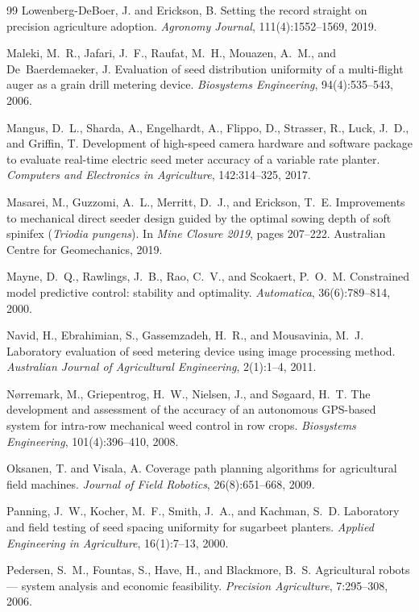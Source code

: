 \begin{thebibliography}{99}
Lowenberg-DeBoer, J. and Erickson, B.
Setting the record straight on precision agriculture adoption.
\textit{Agronomy Journal}, 111(4):1552--1569, 2019.

Maleki, M.~R., Jafari, J.~F., Raufat, M.~H., Mouazen, A.~M., and De~Baerdemaeker, J.
Evaluation of seed distribution uniformity of a multi-flight auger as a grain drill metering device.
\textit{Biosystems Engineering}, 94(4):535--543, 2006.

Mangus, D.~L., Sharda, A., Engelhardt, A., Flippo, D., Strasser, R., Luck, J.~D., and Griffin, T.
Development of high-speed camera hardware and software package to evaluate real-time electric seed meter accuracy of a variable rate planter.
\textit{Computers and Electronics in Agriculture}, 142:314--325, 2017.

Masarei, M., Guzzomi, A.~L., Merritt, D.~J., and Erickson, T.~E.
Improvements to mechanical direct seeder design guided by the optimal sowing depth of soft spinifex (\textit{Triodia pungens}).
In \textit{Mine Closure 2019}, pages 207--222. Australian Centre for Geomechanics, 2019.

Mayne, D.~Q., Rawlings, J.~B., Rao, C.~V., and Scokaert, P.~O.~M.
Constrained model predictive control: stability and optimality.
\textit{Automatica}, 36(6):789--814, 2000.

Navid, H., Ebrahimian, S., Gassemzadeh, H.~R., and Mousavinia, M.~J.
Laboratory evaluation of seed metering device using image processing method.
\textit{Australian Journal of Agricultural Engineering}, 2(1):1--4, 2011.

N{\o}rremark, M., Griepentrog, H.~W., Nielsen, J., and S{\o}gaard, H.~T.
The development and assessment of the accuracy of an autonomous GPS-based system for intra-row mechanical weed control in row crops.
\textit{Biosystems Engineering}, 101(4):396--410, 2008.

Oksanen, T. and Visala, A.
Coverage path planning algorithms for agricultural field machines.
\textit{Journal of Field Robotics}, 26(8):651--668, 2009.

Panning, J.~W., Kocher, M.~F., Smith, J.~A., and Kachman, S.~D.
Laboratory and field testing of seed spacing uniformity for sugarbeet planters.
\textit{Applied Engineering in Agriculture}, 16(1):7--13, 2000.

Pedersen, S.~M., Fountas, S., Have, H., and Blackmore, B.~S.
Agricultural robots --- system analysis and economic feasibility.
\textit{Precision Agriculture}, 7:295--308, 2006.


\end{thebibliography}
